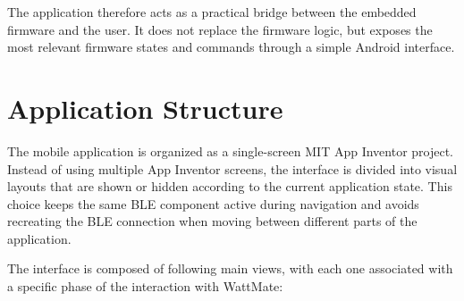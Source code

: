 The application therefore acts as a practical bridge between the embedded firmware and the user. It does not replace the firmware logic, but exposes the most relevant firmware states and commands through a simple Android interface.


\section{Application Structure}
\label{sec:app_structure}

The mobile application is organized as a single-screen MIT App Inventor project. 
Instead of using multiple App Inventor screens, the interface is divided into visual layouts that are shown or hidden according to the current application state. 
This choice keeps the same BLE component active during navigation and avoids recreating the BLE connection when moving between different parts of the application.

The interface is composed of following main views, with each one associated with a specific phase of the interaction with WattMate:

